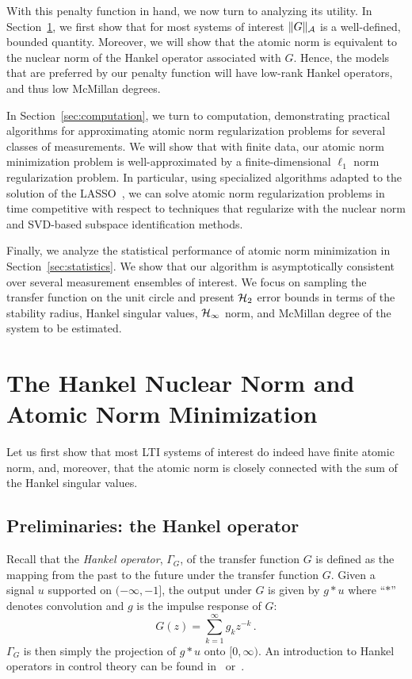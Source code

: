With this penalty function in hand, we now turn to analyzing its utility.  In Section~\ref{sec:hankel}, we first show that for most systems of interest $\|G\|_{\mathcal{A}}$ is a well-defined, bounded quantity.  Moreover, we will show that the atomic norm is equivalent to the nuclear norm of the Hankel operator associated with  $G$.  Hence, the models that are preferred by our penalty function will have low-rank Hankel operators, and thus low McMillan degrees.

In Section~\ref{sec:computation}, we turn to computation, demonstrating practical algorithms for approximating atomic norm regularization problems for several classes of measurements.  We will show that with finite data, our atomic norm minimization problem is well-approximated by a finite-dimensional $\ell_1$ norm regularization problem.  In particular, using specialized algorithms adapted to the solution of the LASSO~\cite{wright09}, we can solve atomic norm regularization problems in time competitive with respect to techniques that regularize with the nuclear norm and SVD-based subspace identification methods.

Finally, we analyze the statistical performance of atomic norm minimization in Section~\ref{sec:statistics}.  We show that our algorithm is asymptotically consistent over several measurement ensembles of interest.  We focus on sampling the transfer function on the unit circle and present $\mathcal{H}_2$ error bounds in terms of the stability radius, Hankel singular values, $\mathcal{H}_{\infty}$ norm, and McMillan degree of the system to be estimated.

\section{The Hankel Nuclear Norm and Atomic Norm Minimization}\label{sec:hankel}

Let us first show that most LTI systems of interest do indeed have finite atomic norm, and, moreover, that the atomic norm is closely connected with the sum of the Hankel singular values.

\subsection{Preliminaries: the Hankel operator}\label{sec:hankel-defs}
Recall that the \emph{Hankel operator}, $\Gamma_G$, of the transfer function $G$ is defined as the mapping from the past to the future under the transfer function $G$.  Given a signal $u$ supported on $(-\infty,-1]$, the output under $G$ is given by $g * u$ where ``$*$'' denotes convolution and $g$ is the impulse response of $G$: 
\[
	G(z) = \sum_{k=1}^\infty g_k z^{-k}\,.
\]
$\Gamma_G$ is then simply the projection of $g*u$ onto $[0,\infty)$.  An introduction to Hankel operators in control theory can be found in~\cite[Chapter 4]{DullerudPaganiniBook} or~\cite[Chapter 7]{Zhou95}.

